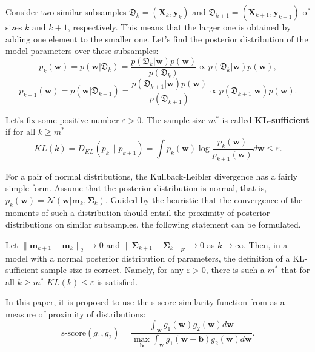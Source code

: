 \documentclass[
11pt,%
tightenlines,%
twoside,%
onecolumn,%
nofloats,%
nobibnotes,%
nofootinbib,%
superscriptaddress,%
noshowpacs,%
centertags]%
{revtex4-2}
\begin{document}
Consider two similar subsamples $\mathfrak{D}_k = (\mathbf{X}_k,\mathbf{y}_k)$ and $\mathfrak{D}_{k+1} = (\mathbf{X}_{k+1}, \mathbf{y}_{k+1})$ of sizes $k$ and $k+1$, respectively. This means that the larger one is obtained by adding one element to the smaller one. Let's find the posterior distribution of the model parameters over these subsamples:
\[p_k(\mathbf{w}) = p(\mathbf{w} | \mathfrak{D}_k) = \dfrac{p(\mathfrak{D}_k | \mathbf{w}) p(\mathbf{w})}{p(\mathfrak{D}_k)} \propto p(\mathfrak{D}_k | \mathbf{w}) p(\mathbf{w}), \]
\[ p_{k+1}(\mathbf{w}) = p(\mathbf{w} | \mathfrak{D}_{k+1}) = \dfrac{p(\mathfrak{D}_{k+1} | \mathbf{w}) p(\mathbf{w})}{p(\mathfrak{D}_{k+1})} \propto p(\mathfrak{D}_{k+1} | \mathbf{w}) p(\mathbf{w}). \]

\begin{definition}
    Let's fix some positive number $\varepsilon > 0$. The sample size $m^*$ is called \textbf{KL-sufficient} if for all $k\geqslant m^*$
    \[ KL(k) = D_{KL}(p_k \| p_{k+1}) = \int p_k(\mathbf{w}) \log{\dfrac{p_k(\mathbf{w})}{p_{k+1}(\mathbf{w})}} d\mathbf{w} \leqslant \varepsilon. \]
\end{definition}

For a pair of normal distributions, the Kullback-Leibler divergence has a fairly simple form. Assume that the posterior distribution is normal, that is, $p_k(\mathbf{w}) = \mathcal{N}\left(\mathbf{w}|\mathbf{m}_k, \mathbf{\Sigma}_k\right)$. Guided by the heuristic that the convergence of the moments of such a distribution should entail the proximity of posterior distributions on similar subsamples, the following statement can be formulated.

\begin{theorem}[Kiselev, 2024]\label{theorem2}
    Let $\|\mathbf{m}_{k+1} - \mathbf{m}_k\|_2 \to 0$ and $\|\mathbf{\Sigma}_{k+1} - \mathbf{\Sigma}_k\|_{F}\to 0$ as $k\to \infty$. Then, in a model with a normal posterior distribution of parameters, the definition of a KL-sufficient sample size is correct. Namely, for any $\varepsilon > 0$, there is such a $m^*$ that for all $k\geqslant m^*$ $KL(k)\leqslant\varepsilon$ is satisfied.
\end{theorem}

In this paper, it is proposed to use the s-score similarity function from \citep{Aduenko2017} as a measure of proximity of distributions:
\[\text{s-score}(g_1, g_2) = \dfrac{\int_{\mathbf{w}} g_1(\mathbf{w}) g_2(\mathbf{w}) d\mathbf{w}}{\max_{\mathbf{b}} \int_{\mathbf{w}} g_1(\mathbf{w} - \mathbf{b}) g_2(\mathbf{w}) d\mathbf{w}}. \]
\end{document}
